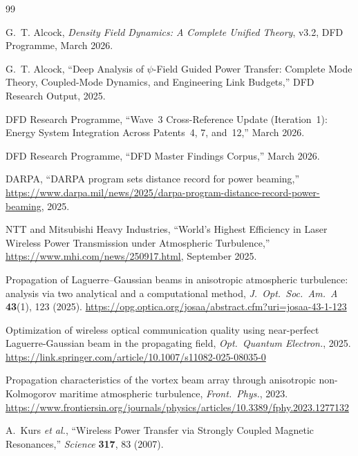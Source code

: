 \documentclass[aps,prd,twocolumn,superscriptaddress]{revtex4-2}
\begin{document}
\begin{thebibliography}{99}

G.~T. Alcock, \textit{Density Field Dynamics: A Complete Unified Theory},
v3.2, DFD Programme, March 2026.

G.~T. Alcock, ``Deep Analysis of $\psi$-Field Guided Power Transfer:
Complete Mode Theory, Coupled-Mode Dynamics, and Engineering Link
Budgets,'' DFD Research Output, 2025.

DFD Research Programme, ``Wave~3 Cross-Reference Update (Iteration~1):
Energy System Integration Across Patents~4, 7, and~12,'' March 2026.

DFD Research Programme, ``DFD Master Findings Corpus,'' March 2026.

DARPA, ``DARPA program sets distance record for power beaming,''
\url{https://www.darpa.mil/news/2025/darpa-program-distance-record-power-beaming},
2025.

NTT and Mitsubishi Heavy Industries, ``World's Highest Efficiency in
Laser Wireless Power Transmission under Atmospheric Turbulence,''
\url{https://www.mhi.com/news/250917.html}, September 2025.

Propagation of Laguerre--Gaussian beams in anisotropic atmospheric
turbulence: analysis via two analytical and a computational method,
\textit{J.\ Opt.\ Soc.\ Am.\ A} \textbf{43}(1), 123 (2025).
\url{https://opg.optica.org/josaa/abstract.cfm?uri=josaa-43-1-123}

Optimization of wireless optical communication quality using near-perfect
Laguerre-Gaussian beam in the propagating field,
\textit{Opt.\ Quantum Electron.}, 2025.
\url{https://link.springer.com/article/10.1007/s11082-025-08035-0}

Propagation characteristics of the vortex beam array through anisotropic
non-Kolmogorov maritime atmospheric turbulence,
\textit{Front.\ Phys.}, 2023.
\url{https://www.frontiersin.org/journals/physics/articles/10.3389/fphy.2023.1277132}

A.~Kurs \textit{et al.}, ``Wireless Power Transfer via Strongly Coupled
Magnetic Resonances,'' \textit{Science} \textbf{317}, 83 (2007).

\end{thebibliography}
\end{document}
